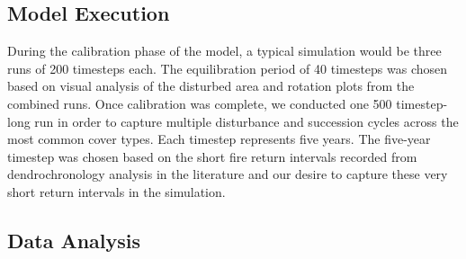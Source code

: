 \subsection{Model Execution}
During the calibration phase of the model, a typical simulation would be three runs of 200 timesteps each. The equilibration period of 40 timesteps was chosen based on visual analysis of the disturbed area and rotation plots from the combined runs. Once calibration was complete, we conducted one 500 timestep-long run in order to capture multiple disturbance and succession cycles across the most common cover types. Each timestep represents five years. The five-year timestep was chosen based on the short fire return intervals recorded from dendrochronology analysis in the literature and our desire to capture these very short return intervals in the simulation.

\subsection{Data Analysis}

